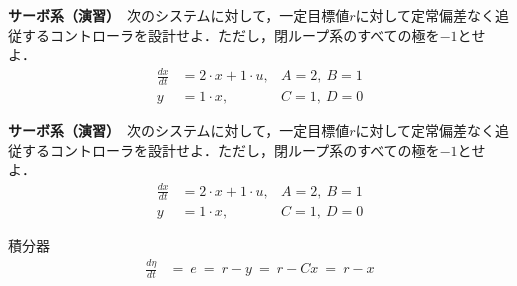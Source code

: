 



\exheader

\noindent
{\bf サーボ系（演習）}　次のシステムに対して，一定目標値$r$に対して定常偏差なく追従するコントローラを設計せよ．ただし，閉ループ系のすべての極を$-1$とせよ．
\begin{align*}
	\frac{dx}{dt} &= 2 \cdot x + 1 \cdot u, \hspace{0cm} &A=2,\  B=1
\\
	y &= 1 \cdot x , &C=1, \ D=0
\end{align*}


\newpage
\noindent
{\bf サーボ系（演習）}　次のシステムに対して，一定目標値$r$に対して定常偏差なく追従するコントローラを設計せよ．ただし，閉ループ系のすべての極を$-1$とせよ．
\begin{align*}
	\frac{dx}{dt} &= 2 \cdot x + 1 \cdot u, \hspace{0cm} &A=2,\  B=1
\\
	y &= 1 \cdot x , &C=1, \ D=0
\end{align*}

積分器
\begin{align*}
	\frac{d \eta}{dt}&= \ e \ = \ r-y \ = \ r-Cx \ = \ r-x
\end{align*}

